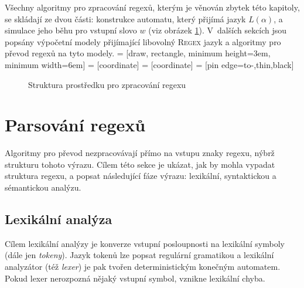 \documentclass[thesis=B,czech]{FITthesis}[2019/12/23]
\theoremstyle{definition}
\begin{document}
Všechny algoritmy pro zpracování regexů, kterým je věnován zbytek této kapitoly, se skládají ze dvou části: konstrukce automatu, který přijímá jazyk $L\left(\alpha\right)$, a simulace jeho běhu pro vstupní slovo $w$ (viz obrázek \ref{fig:engine}). V~dalších sekcích jsou popsány výpočetní modely přijímající libovolný \textsc{Regex} jazyk a algoritmy pro převod regexů na tyto modely.
 = [draw, rectangle, 
    minimum height=3em, minimum width=6em]
 = [coordinate]
 = [coordinate]
 = [pin edge={to-,thin,black}]
\begin{figure}[h]
\centering
{}
\caption{Struktura prostředku pro zpracování regexu}\label{fig:engine}
\end{figure}
\section{Parsování regexů}
Algoritmy pro převod nezpracovávají přímo na vstupu znaky regexu, nýbrž strukturu tohoto výrazu. Cílem této sekce je ukázat, jak by mohla vypadat struktura regexu, a popsat následující fáze  výrazu: lexikální, syntaktickou a sémantickou analýzu.

\subsection{Lexikální analýza}
Cílem lexikální analýzy je konverze vstupní posloupnosti na lexikální symboly (dále jen \emph{tokeny}). Jazyk tokenů lze popsat regulární gramatikou a lexikální analyzátor (též \emph{lexer}) je pak tvořen deterministickým konečným automatem. Pokud lexer nerozpozná nějaký vstupní symbol, vznikne lexikální chyba. 
\end{document}

